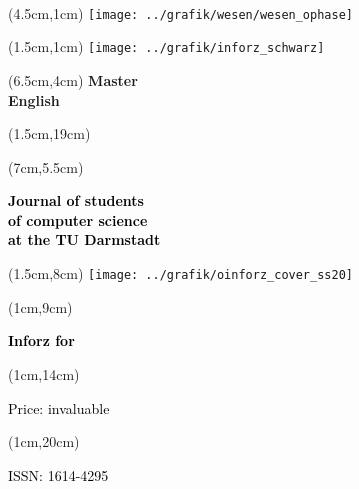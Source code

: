 \begin{titlepage}~





\begin{textblock*}{12cm}(4.5cm,1cm)
\texttt{[image: ../grafik/wesen/wesen\_ophase]}
\end{textblock*}

\begin{textblock*}{12cm}(1.5cm,1cm)
	\texttt{[image: ../grafik/inforz\_schwarz]}
\end{textblock*}



\begin{textblock*}{12cm}(6.5cm,4cm)
\centering\fontsize{80}{25}\sffamily\textbf{
\textcolor{mycolor}{Master } \\
\textcolor{mycolor}{English}}
\end{textblock*}


\begin{textblock*}{12cm}(1.5cm,19cm)
\centering\huge\sffamily\textbf{
}
\end{textblock*}


\begin{textblock*}{7cm}(7cm,5.5cm)
\begin{flushright}
\large\sffamily\textbf{
	\textcolor{black}{Journal of students}\\
	\textcolor{black}{of computer science\\at the TU Darmstadt}}
\end{flushright}
\end{textblock*}

\begin{textblock*}{18cm}(1.5cm,8cm)
	\texttt{[image: ../grafik/oinforz\_cover\_ss20]}
\end{textblock*}

\begin{textblock*}{5cm}(1cm,9cm)
\begin{rotate}{90}
\sffamily\huge\textbf{
	\textcolor{black}{Inforz for \ophase}}
\end{rotate}
\end{textblock*}


\begin{textblock*}{2cm}(1cm,14cm)
\begin{rotate}{90}
\sffamily\small \textcolor{black}{Price: invaluable}
\end{rotate}
\end{textblock*}


\begin{textblock*}{2cm}(1cm,20cm)
\begin{rotate}{90}
\sffamily \textcolor{black}{ISSN: 1614-4295}
\end{rotate}
\end{textblock*}

\end{titlepage}
\newpage
